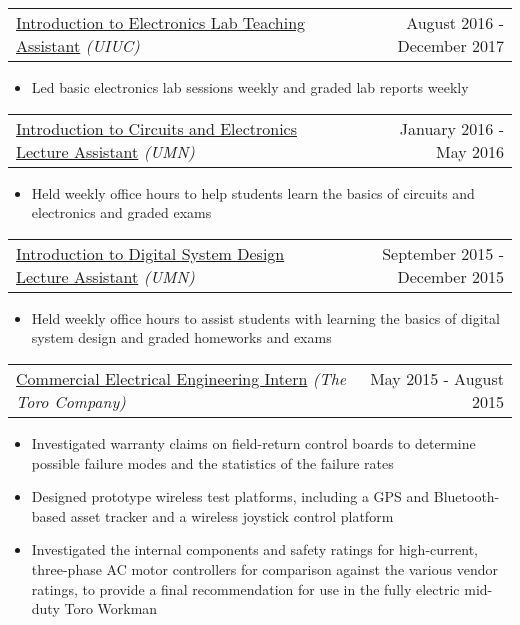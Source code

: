 \documentclass[10pt, letterpaper]{article}
\makeatletter
\newcommand{\headerrow}[2]
{\begin{tabular*}{\linewidth}{l@{\extracolsep{\fill}}r}
	#1 &
	#2 \\
\end{tabular*}}
\makeatother
\begin{document}
\headerrow
	{\uline{Introduction to Electronics Lab Teaching Assistant} \textit{(UIUC)}}
	{August 2016 - December 2017}
	\begin{itemize}
		\item Led basic electronics lab sessions weekly and graded lab reports weekly
	\end{itemize}

\headerrow
	{\uline{Introduction to Circuits and Electronics Lecture Assistant} \textit{(UMN)}}
	{January 2016 - May 2016}
	\begin{itemize}
		\item Held weekly office hours to help students learn the basics of circuits and electronics and graded exams
	\end{itemize}


\headerrow
	{\uline{Introduction to Digital System Design Lecture Assistant} \textit{(UMN)}}
	{September 2015 - December 2015}
	\begin{itemize}
		\item Held weekly office hours to assist students with learning the basics of digital system design and graded homeworks and exams%
	\end{itemize}

\headerrow
	{\uline{Commercial Electrical Engineering Intern} \textit{(The Toro Company)}}
	{May 2015 - August 2015}
	\begin{itemize}
		\item Investigated warranty claims on field-return control boards to determine possible failure modes and the statistics of the failure rates
		\item Designed prototype wireless test platforms, including a GPS and Bluetooth-based asset tracker and a wireless joystick control platform
		\item Investigated the internal components and safety ratings for high-current, three-phase AC motor controllers for comparison against the various vendor ratings, to provide a final recommendation for use in the fully electric mid-duty Toro Workman
	\end{itemize}
\end{document}
